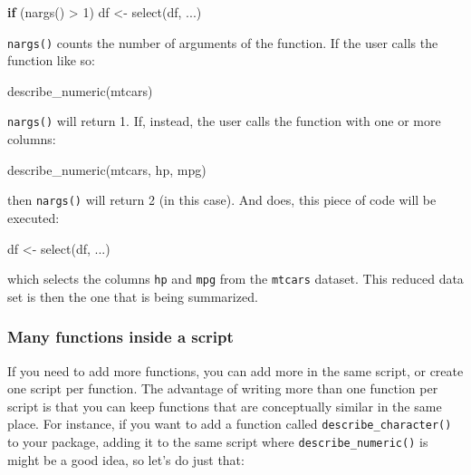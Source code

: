 \documentclass[
]{article}
\newenvironment{Shaded}{\begin{snugshade}}{\end{snugshade}}
\newcommand{\ControlFlowTok}[1]{\textcolor[rgb]{0.13,0.29,0.53}{\textbf{#1}}}
\newcommand{\DecValTok}[1]{\textcolor[rgb]{0.00,0.00,0.81}{#1}}
\newcommand{\FunctionTok}[1]{\textcolor[rgb]{0.00,0.00,0.00}{#1}}
\newcommand{\NormalTok}[1]{#1}
\newcommand{\OtherTok}[1]{\textcolor[rgb]{0.56,0.35,0.01}{#1}}
\newcommand{\SpecialCharTok}[1]{\textcolor[rgb]{0.00,0.00,0.00}{#1}}
\begin{document}
\begin{Shaded}
\begin{Highlighting}[]
  \ControlFlowTok{if}\NormalTok{ (}\FunctionTok{nargs}\NormalTok{() }\SpecialCharTok{\textgreater{}} \DecValTok{1}\NormalTok{) df }\OtherTok{\textless{}{-}} \FunctionTok{select}\NormalTok{(df, ...)}
\end{Highlighting}
\end{Shaded}

\texttt{nargs()} counts the number of arguments of the function. If the user calls the function like so:

\begin{Shaded}
\begin{Highlighting}[]
\FunctionTok{describe\_numeric}\NormalTok{(mtcars)}
\end{Highlighting}
\end{Shaded}

\texttt{nargs()} will return 1. If, instead, the user calls the function with one or more columns:

\begin{Shaded}
\begin{Highlighting}[]
\FunctionTok{describe\_numeric}\NormalTok{(mtcars, hp, mpg)}
\end{Highlighting}
\end{Shaded}

then \texttt{nargs()} will return 2 (in this case). And does, this piece of code will be executed:

\begin{Shaded}
\begin{Highlighting}[]
\NormalTok{df }\OtherTok{\textless{}{-}} \FunctionTok{select}\NormalTok{(df, ...)}
\end{Highlighting}
\end{Shaded}

which selects the columns \texttt{hp} and \texttt{mpg} from the \texttt{mtcars} dataset. This reduced data set is then
the one that is being summarized.

\hypertarget{many-functions-inside-a-script}{%
\subsubsection{Many functions inside a script}\label{many-functions-inside-a-script}}

If you need to add more functions, you can add more in the same
script, or create one script per function. The advantage of writing more than one function per
script is that you can keep functions that are conceptually similar in the same place. For instance,
if you want to add a function called \texttt{describe\_character()} to your package, adding it to the same
script where \texttt{describe\_numeric()} is might be a good idea, so let's do just that:
\end{document}
